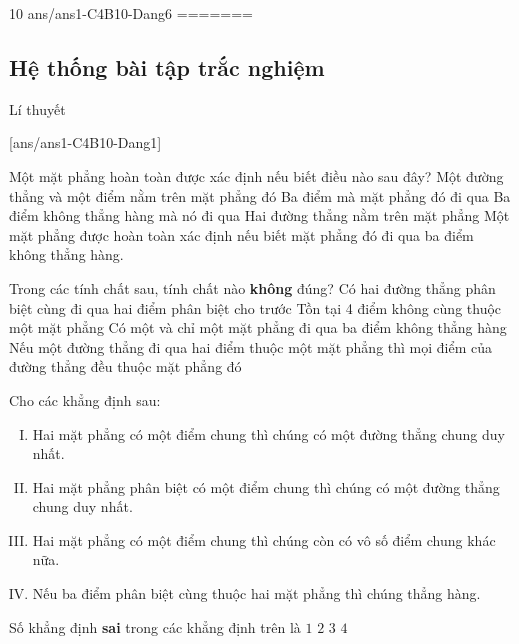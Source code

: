 \begin{indapan}{10}
	{ans/ans1-C4B10-Dang6}
=======
\subsection{Hệ thống bài tập trắc nghiệm}
\setcounter{dang}{0}
\begin{dang}{Lí thuyết}
\end{dang}
[ans/ans1-C4B10-Dang1]
\begin{ex}%
Một mặt phẳng hoàn toàn được xác định nếu biết điều nào sau đây?
\choice
{Một đường thẳng và một điểm nằm trên mặt phẳng đó}
{Ba điểm mà mặt phẳng đó đi qua}
{\True Ba điểm không thẳng hàng mà nó đi qua}
{Hai đường thẳng nằm trên mặt phẳng}
\loigiai
{ 
Một mặt phẳng được hoàn toàn xác định nếu biết mặt phẳng đó đi qua ba điểm không thẳng hàng.
}
\end{ex}

\begin{ex}%
	Trong các tính chất sau, tính chất nào {\bf không} đúng?
	\choice
	{\True Có hai đường thẳng phân biệt cùng đi qua hai điểm phân biệt cho trước}
	{Tồn tại 4 điểm không cùng thuộc một mặt phẳng}
	{Có một và chỉ một mặt phẳng đi qua ba điểm không thẳng hàng}
	{Nếu một đường thẳng đi qua hai điểm thuộc một mặt phẳng thì mọi điểm của đường thẳng đều thuộc mặt phẳng đó}
\end{ex}

\begin{ex}%
	Cho các khẳng định sau:
	\begin{enumerate}[(I)]
		\item Hai mặt phẳng có một điểm chung thì chúng có một đường thẳng chung duy nhất.
		\item Hai mặt phẳng phân biệt có một điểm chung thì chúng có một đường thẳng chung duy nhất.
		\item Hai mặt phẳng có một điểm chung thì chúng còn có vô số điểm chung khác nữa.
		\item Nếu ba điểm phân biệt cùng thuộc hai mặt phẳng thì chúng thẳng hàng.
	\end{enumerate}
	Số khẳng định {\bf sai} trong các khẳng định trên là
	\choice
	{$1$}
	{\True $2$}
	{$3$}
	{$4$}
\end{ex}


\end{indapan}
